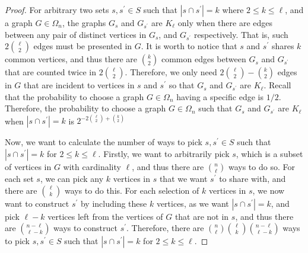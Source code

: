 \begin{proof}
  For arbitrary two sets $s, s^{'} \in S$ such that $|s \cap s^{'}| = k$ where $2 \leq k \leq \ell$, and a graph $G \in \Omega_{n}$, the graphs $G_{s}$ and $G_{s^{'}}$ are $K_{\ell}$ only when there are edges between any pair of distinct vertices in $G_{s}$, and $G_{s^{'}}$ respectively. That is, such $2 \binom{\ell}{2}$ edges must be presented in $G$. It is worth to notice that $s$ and $s^{'}$ shares $k$ common vertices, and thus there are $\binom{k}{2}$ common edges between $G_{s}$ and $G_{s^{'}}$ that are counted twice in $2 \binom{\ell}{2}$. Therefore, we only need $2\binom{\ell}{2} - \binom{k}{2}$ edges in $G$ that are incident to vertices in $s$ and $s^{'}$ so that $G_{s}$ and $G_{s^{'}}$ are $K_{\ell}$. Recall that the probability to choose a graph $G \in \Omega_{n}$ having a specific edge is $1/2$. Therefore, the probability to choose a graph $G \in \Omega_{n}$ such that $G_{s}$ and $G_{s^{'}}$ are $K_{\ell}$ when $|s \cap s^{'}| = k$ is $2^{-2\binom{\ell}{2} + \binom{k}{2}}$

  Now, we want to calculate the number of ways to pick $s,s^{'} \in S$ such that $|s \cap s^{'}| = k$ for $2 \leq k \leq \ell$. Firstly, we want to arbitrarily pick $s$, which is a subset of vertices in $G$ with cardinality $\ell$, and thus there are $\binom{n}{\ell}$ ways to do so. For each set $s$, we can pick any $k$ vertices in $s$ that we want $s^{'}$ to share with, and there are $\binom{\ell}{k}$ ways to do this. For each selection of $k$ vertices in $s$, we now want to construct $s^{'}$ by including these $k$ vertices, as we want $|s \cap s^{'}| = k$, and pick $\ell-k$ vertices left from the vertices of $G$ that are not in $s$, and thus there are $\binom{n-\ell}{\ell-k}$ ways to construct $s^{'}$. Therefore, there are $\binom{n}{\ell} \binom{\ell}{k} \binom{n-\ell}{\ell-k}$ ways to pick $s,s^{'} \in S$ such that $|s \cap s^{'}| = k$ for $2 \leq k \leq \ell$.



\end{proof}
